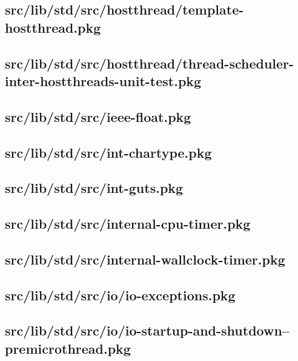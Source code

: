 \subsection{src/lib/std/src/hostthread/template-hostthread.pkg}


\subsection{src/lib/std/src/hostthread/thread-scheduler-inter-hostthreads-unit-test.pkg}


\subsection{src/lib/std/src/ieee-float.pkg}


\subsection{src/lib/std/src/int-chartype.pkg}


\subsection{src/lib/std/src/int-guts.pkg}


\subsection{src/lib/std/src/internal-cpu-timer.pkg}


\subsection{src/lib/std/src/internal-wallclock-timer.pkg}


\subsection{src/lib/std/src/io/io-exceptions.pkg}


\subsection{src/lib/std/src/io/io-startup-and-shutdown--premicrothread.pkg}


